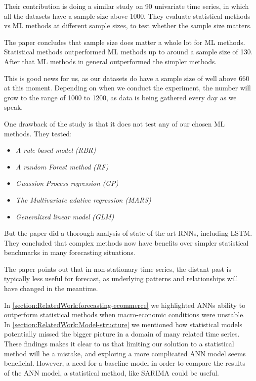 Their contribution is doing a similar study on 90 univariate time series, in which 
all the datasets have a sample size above 1000. They evaluate statistical methods vs ML methods
at different sample sizes, to test whether the sample size matters.

The paper \cite{Cerqueira2019} concludes that sample size does matter a whole lot for ML methods.
Statistical methods outperformed ML methods up to around a sample size of 130. After that ML methods
in general outperformed the simpler methods.

This is good news for us, as our datasets do have a sample size of well above 660 at this moment.
Depending on when we conduct the experiment, the number will grow to the range of 1000 to 1200,
as data is being gathered every day as we speak.

One drawback of the \cite{Makridakis2018} study is that it does not test any of our chosen ML methods.
They tested:
\begin{itemize}
  \item \textit{A rule-based model (RBR)}
  \item \textit{A random Forest method (RF)}
  \item \textit{Guassion Process regression (GP)}
  \item \textit{The Multivariate adative regression (MARS)}
  \item \textit{Generalized linear model (GLM)}
\end{itemize}
But the paper \cite{Hewamalage2021} did a thorough analysis of state-of-the-art RNNs, including LSTM.
They concluded that complex methods now have benefits over simpler statistical benchmarks in many forecasting situations.

The paper \cite{Bandara2017} points out that in non-stationary time series, the distant past is typically less
useful for forecast, as underlying patterns and relationships will have changed in the meantime.

In \autoref{section:RelatedWork:forecasting-ecommerce}
we highlighted ANNs ability to outperform statistical methods when macro-economic 
conditions were unstable.
In \autoref{section:RelatedWork:Model-structure} we mentioned how statistical models
potentially missed the bigger picture in a domain of many related time series.
These findings makes it clear to us that limiting our solution to a statistical method
will be a mistake, and exploring a more complicated ANN model seems beneficial.
However, a need for a baseline model in order to compare the results of the ANN model,
a statistical method, like SARIMA could be useful.
